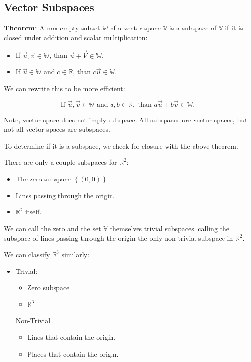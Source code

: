     \subsection{Vector Subspaces}
    \textbf{Theorem:} A non-empty subset $\mathbb{W}$ of a vector space $\mathbb{V}$ is a subspace of $\mathbb{V}$ if it is closed under addition and scalar multiplication:
    \begin{itemize}
        \item If $\vec{u}, \vec{v} \in \mathbb{W}$, than $\vec{u} + \vec{V} \in \mathbb{W}$.
        \item If $\vec{u} \in \mathbb{W}$ and $c \in \mathbb{R}$, than $c\vec{u} \in \mathbb{W}$.
    \end{itemize}

    We can rewrite this to be more efficient:

    \begin{equation}\label{eq:subspace_closure}
        \text{If } \vec{u}, \vec{v} \in \mathbb{W} \text{ and } a, b \in \mathbb{R}, \text{ than } a\vec{u} + b\vec{v} \in \mathbb{W}.
    \end{equation}

    Note, vector space does not imply subspace. All subspaces are vector spaces, but not all vector spaces are subspaces.

    To determine if it is a subspace, we check for closure with the above theorem.

    There are only a couple subspaces for $\mathbb{R}^2$:
    \begin{itemize}
        \item The zero subspace $\left\{ (0, 0) \right\}$.
        \item Lines passing through the origin.
        \item $\mathbb{R}^2$ itself.
    \end{itemize}

    We can call the zero and the set $\mathbb{V}$ themselves trivial subspaces, calling the subspace of lines passing through the origin the only non-trivial subspace in $\mathbb{R}^2$.

    We can classify $\mathbb{R}^3$ similarly:
    \begin{itemize}
    \item Trivial:
        \begin{itemize}
        \item Zero subspace
        \item $\mathbb{R}^3$
        \end{itemize}
    Non-Trivial
        \begin{itemize}
        \item Lines that contain the origin.
        \item Places that contain the origin.
        \end{itemize}
    \end{itemize}

